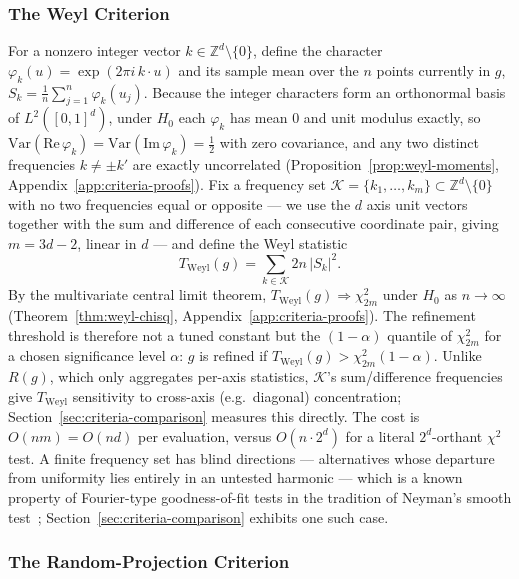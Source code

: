 \documentclass[11pt]{article}
\begin{document}
\subsubsection{The Weyl Criterion}

For a nonzero integer vector $k \in \mathbb{Z}^d \setminus \{0\}$, define the character $\varphi_k(u) = \exp(2\pi i\, k \cdot u)$ and its sample mean over the $n$ points currently in $g$, $S_k = \frac{1}{n}\sum_{j=1}^{n} \varphi_k(u_j)$. Because the integer characters form an orthonormal basis of $L^2([0,1]^d)$, under $H_0$ each $\varphi_k$ has mean $0$ and unit modulus exactly, so $\mathrm{Var}(\mathrm{Re}\,\varphi_k) = \mathrm{Var}(\mathrm{Im}\,\varphi_k) = \tfrac12$ with zero covariance, and any two distinct frequencies $k \neq \pm k'$ are exactly uncorrelated (Proposition~\ref{prop:weyl-moments}, Appendix~\ref{app:criteria-proofs}). Fix a frequency set $\mathcal{K} = \{k_1,\ldots,k_m\} \subset \mathbb{Z}^d\setminus\{0\}$ with no two frequencies equal or opposite — we use the $d$ axis unit vectors together with the sum and difference of each consecutive coordinate pair, giving $m = 3d-2$, linear in $d$ — and define the Weyl statistic
\[
T_{\mathrm{Weyl}}(g) = \sum_{k \in \mathcal{K}} 2n\,|S_k|^2.
\]
By the multivariate central limit theorem, $T_{\mathrm{Weyl}}(g) \Rightarrow \chi^2_{2m}$ under $H_0$ as $n \to \infty$ (Theorem~\ref{thm:weyl-chisq}, Appendix~\ref{app:criteria-proofs}). The refinement threshold is therefore not a tuned constant but the $(1-\alpha)$ quantile of $\chi^2_{2m}$ for a chosen significance level $\alpha$: $g$ is refined if $T_{\mathrm{Weyl}}(g) > \chi^2_{2m}(1-\alpha)$. Unlike $R(g)$, which only aggregates per-axis statistics, $\mathcal{K}$'s sum/difference frequencies give $T_{\mathrm{Weyl}}$ sensitivity to cross-axis (e.g.\ diagonal) concentration; Section~\ref{sec:criteria-comparison} measures this directly. The cost is $O(nm) = O(nd)$ per evaluation, versus $O(n\cdot 2^d)$ for a literal $2^d$-orthant $\chi^2$ test. A finite frequency set has blind directions — alternatives whose departure from uniformity lies entirely in an untested harmonic — which is a known property of Fourier-type goodness-of-fit tests in the tradition of Neyman's smooth test~\cite{Neyman1937Smooth}; Section~\ref{sec:criteria-comparison} exhibits one such case.

\subsubsection{The Random-Projection Criterion}
\end{document}
